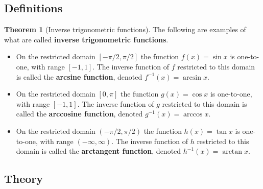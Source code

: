 \documentclass[11pt]{article}
\theoremstyle{definition}
\newtheorem*{comment}{Comment}
\theoremstyle{named}
\newtheorem*{namedtheorem}{Theorem}
\numberwithin{myalgctr}{section}
\begin{document}
\thispagestyle{fancy}
\subsection*{Definitions}
\begin{namedtheorem}[Inverse trigonometric functions] The following are examples of what are called {\bf inverse trigonometric functions}.
  \begin{itemize}
    \item On the restricted domain $[-\pi/2, \pi/2]$ the function $f(x)=\sin x$ is one-to-one, with range $[-1,1]$. The inverse function of $f$ restricted to this domain is called the {\bf arcsine function}, denoted $f^{-1}(x)=\arcsin x$.
    \item On the restricted domain $[0, \pi]$ the function $g(x)=\cos x$ is one-to-one, with range $[-1,1]$. The inverse function of $g$ restricted to this domain is called the {\bf arccosine function}, denoted $g^{-1}(x)=\arccos x$.
    \item On the restricted domain $(-\pi/2, \pi/2)$ the function $h(x)=\tan x$ is one-to-one, with range $(-\infty, \infty)$. The inverse function of $h$ restricted to this domain is called the {\bf arctangent function}, denoted $h^{-1}(x)=\arctan x$.
  \end{itemize}

\end{namedtheorem}
\begin{comment}
Occasionally an alternative notation is used to denote inverse trig functions: namely,
\begin{align*}
  \arcsin x&=\sin^{-1} x & \arccos x&=\cos^{-1} x & \arctan x&=\tan^{-1} x.
\end{align*}
We will avoid this alternative notation as it misleadingly suggests these inverse trigonometric functions are {\em reciprocals} of the corresponding trigonometric functions. They are not!
\end{comment}

 \subsection*{Theory}
\end{document}
